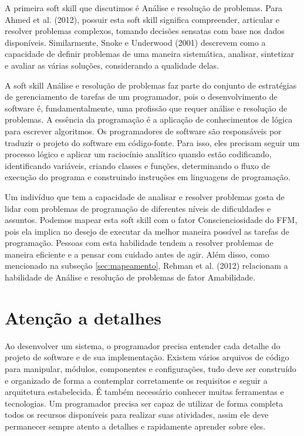 A primeira soft skill que discutimos é Análise e resolução de problemas. Para Ahmed et al. (2012)\nocite{ahmed:12}, possuir esta soft skill significa compreender, articular e resolver problemas complexos, tomando decisões sensatas com base nos dados disponíveis. Similarmente, Snoke e Underwood (2001)\nocite{snoke:01} descrevem como a capacidade de definir problemas de uma maneira sistemática, analisar, sintetizar e avaliar as várias soluções, considerando a qualidade delas. 

A soft skill Análise e resolução de problemas faz parte do conjunto de estratégias de gerenciamento de tarefas de um programador, pois o desenvolvimento de software é, fundamentalmente, uma profissão que requer análise e resolução de problemas. A essência da programação é a aplicação de conhecimentos de lógica para escrever algoritmos. Os programadores de software são responsáveis por traduzir o projeto do software em código-fonte. Para isso, eles precisam seguir um processo lógico e aplicar um raciocínio analítico quando estão codificando, identificando variáveis, criando classes e funções, determinando o fluxo de execução do programa e construindo instruções em linguagens de programação. 

Um indivíduo que tem a capacidade de analisar e resolver problemas gosta de lidar com problemas de programação de diferentes níveis de dificuldades e assuntos.
Podemos mapear esta soft skill com o fator Conscienciosidade do FFM, pois ela implica no desejo de executar da melhor maneira possível as tarefas de programação.
Pessoas com esta habilidade tendem a resolver problemas de maneira eficiente e a pensar com cuidado antes de agir.
Além disso, como mencionado na subseção \ref{sec:mapeamento}, Rehman et al. (2012)\nocite{rehman:12}
relacionam a habilidade de Análise e resolução de problemas de fator Amabilidade.

\section{Atenção a detalhes}

Ao desenvolver um sistema, o programador precisa entender cada detalhe do projeto de software e de sua implementação. Existem vários arquivos de código para manipular, módulos, componentes e configurações, tudo deve ser construído e organizado de forma a contemplar corretamente os requisitos e seguir a arquitetura estabelecida. É também necessário conhecer muitas ferramentas e tecnologias. Um programador precisa ser capaz de utilizar de forma completa todos os recursos disponíveis para realizar suas atividades, assim ele deve permanecer sempre atento a detalhes e rapidamente aprender sobre eles.


